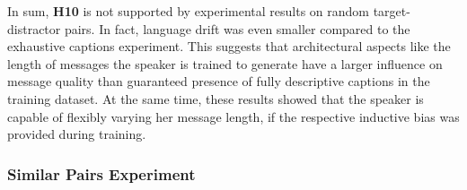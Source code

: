 In sum, \textbf{H10} is not supported by experimental results on random target-distractor pairs. In fact, language drift was even smaller compared to the exhaustive captions experiment. This suggests that architectural aspects like the length of messages the speaker is trained to generate have a larger influence on message quality than guaranteed presence of fully descriptive captions in the training dataset. At the same time, these results showed that the speaker is capable of flexibly varying her message length, if the respective inductive bias was provided during training. 

\subsubsection{Similar Pairs Experiment}
\label{expt:3d_similar}

